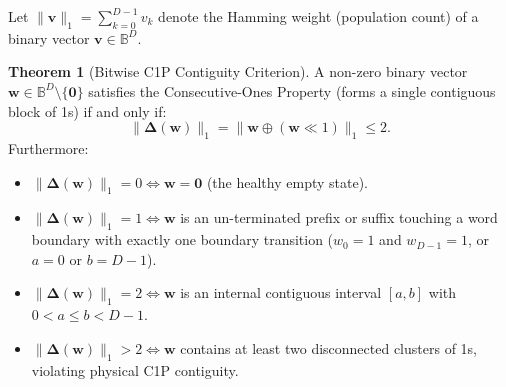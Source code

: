 \documentclass[11pt,a4paper]{article}
\theoremstyle{definition}
\newtheorem{theorem}{Theorem}
\begin{document}
Let $\|\mathbf{v}\|_1 = \sum_{k=0}^{D-1} v_k$ denote the Hamming weight (population count) of a binary vector $\mathbf{v} \in \mathbb{B}^D$.

\begin{theorem}[Bitwise C1P Contiguity Criterion]
A non-zero binary vector $\mathbf{w} \in \mathbb{B}^D \setminus \{\mathbf{0}\}$ satisfies the Consecutive-Ones Property (forms a single contiguous block of 1s) if and only if:
\begin{equation}
    \|\bm{\Delta}(\mathbf{w})\|_1 = \|\mathbf{w} \oplus (\mathbf{w} \ll 1)\|_1 \le 2.
\end{equation}
Furthermore:
\begin{itemize}
    \item $\|\bm{\Delta}(\mathbf{w})\|_1 = 0 \iff \mathbf{w} = \mathbf{0}$ (the healthy empty state).
    \item $\|\bm{\Delta}(\mathbf{w})\|_1 = 1 \iff \mathbf{w}$ is an un-terminated prefix or suffix touching a word boundary with exactly one boundary transition ($w_0 = 1$ and $w_{D-1} = 1$, or $a=0$ or $b=D-1$).
    \item $\|\bm{\Delta}(\mathbf{w})\|_1 = 2 \iff \mathbf{w}$ is an internal contiguous interval $[a, b]$ with $0 < a \le b < D-1$.
    \item $\|\bm{\Delta}(\mathbf{w})\|_1 > 2 \iff \mathbf{w}$ contains at least two disconnected clusters of 1s, violating physical C1P contiguity.
\end{itemize}
\end{theorem}
\end{document}
